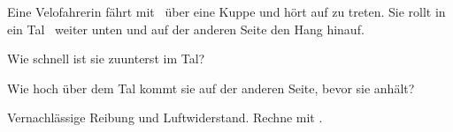 Eine Velofahrerin fährt mit \vKO\ über eine Kuppe und hört auf zu treten. Sie rollt in ein Tal \hTO\ weiter unten und auf der anderen Seite den Hang hinauf.

\begin{abcliste}
\abc
Wie schnell ist sie zuunterst im Tal?

\abc
Wie hoch über dem Tal kommt sie auf der anderen Seite, bevor sie anhält?
\end{abcliste}

Vernachlässige Reibung und Luftwiderstand. Rechne mit \gO.
